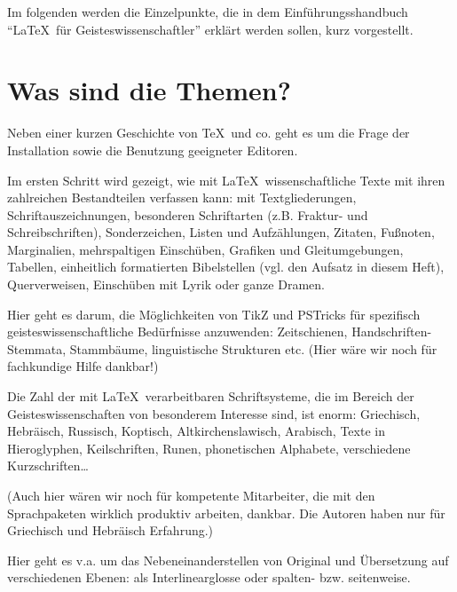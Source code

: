 \documentclass[ngerman]{dtk}
\begin{document}
Im folgenden werden die Einzelpunkte, die in dem Einführungsshandbuch \enquote{\LaTeX\ für Geisteswissenschaftler}
erklärt werden sollen, kurz vorgestellt.


\section{Was sind die Themen?}



Neben einer kurzen Geschichte von \TeX\ und co. geht es um die Frage der Installation sowie die Benutzung 
geeigneter Editoren.


Im ersten Schritt wird gezeigt, wie mit \LaTeX\ wissenschaftliche Texte mit ihren zahlreichen Bestandteilen
verfassen kann: mit Textgliederungen, Schriftauszeichnungen, besonderen Schriftarten (z.B. Fraktur- und
Schreibschriften), Sonderzeichen, Listen und Aufzählungen, Zitaten, Fußnoten, Marginalien, mehrspaltigen
Einschüben, Grafiken und Gleitumgebungen, Tabellen, einheitlich formatierten Bibelstellen (vgl. den Aufsatz
in diesem Heft), Querverweisen, Einschüben mit Lyrik oder ganze Dramen.  


Hier geht es darum, die Möglichkeiten von TikZ und PSTricks für spezifisch geisteswissenschaftliche
Bedürfnisse anzuwenden: Zeitschienen, Handschriften-Stemmata, Stammbäume, linguistische Strukturen etc.
(Hier wäre wir noch für fachkundige Hilfe dankbar!)


Die Zahl der mit \LaTeX\ verarbeitbaren Schriftsysteme, die im Bereich der Geisteswissenschaften von besonderem 
Interesse sind, ist enorm:
Griechisch,
Hebräisch,
Russisch,
Koptisch,
Altkirchenslawisch,
Arabisch,
Texte in Hieroglyphen,
Keilschriften,
Runen,
phonetischen Alphabete,
verschiedene Kurzschriften\ldots

(Auch hier wären wir noch für kompetente Mitarbeiter, die mit den Sprachpaketen wirklich produktiv 
arbeiten, dankbar. Die Autoren haben nur für Griechisch und Hebräisch Erfahrung.)


Hier geht es v.a. um das Nebeneinanderstellen von Original und Übersetzung auf verschiedenen Ebenen:
als Interlinearglosse oder spalten- bzw. seitenweise.
\end{document}

